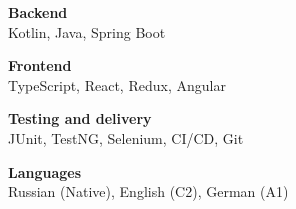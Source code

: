 
\begin{minipage}[t]{.24\textwidth}
\vspace{-4.55pt}
\fontsize{7pt}{9pt}\selectfont
\setlength{\parskip}{0pt}
\raggedright
{\bodyfont\bfseries\color{darktext}Backend}\\
{\bodyfontlight\color{text}Kotlin, Java, Spring Boot}\par
\end{minipage}%
\hspace{2pt}
\begin{minipage}[t]{.24\textwidth}
\vspace{-4.55pt}
\fontsize{7pt}{9pt}\selectfont
\setlength{\parskip}{0pt}
\raggedright
{\bodyfont\bfseries\color{darktext}Frontend}\\
{\bodyfontlight\color{text}TypeScript, React, Redux, Angular}\par
\end{minipage}%
\hspace{2pt}
\begin{minipage}[t]{.24\textwidth}
\vspace{-4.55pt}
\fontsize{7pt}{9pt}\selectfont
\setlength{\parskip}{0pt}
\raggedright
{\bodyfont\bfseries\color{darktext}Testing and delivery}\\
{\bodyfontlight\color{text}JUnit, TestNG, Selenium, CI/CD, Git}\par
\end{minipage}%
\hspace{2pt}
\begin{minipage}[t]{.24\textwidth}
\vspace{-4.55pt}
\fontsize{7pt}{9pt}\selectfont
\setlength{\parskip}{0pt}
\raggedright
{\bodyfont\bfseries\color{darktext}Languages}\\
{\bodyfontlight\color{text}Russian (Native), English (C2), German (A1)}\par
\end{minipage}%
